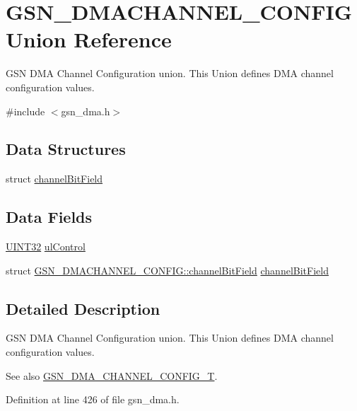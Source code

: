 \hypertarget{a00052}{
\section{GSN\_\-DMACHANNEL\_\-CONFIG Union Reference}
\label{a00052}
}


GSN DMA Channel Configuration union. This Union defines DMA channel configuration values.  




{\ttfamily \#include $<$gsn\_\-dma.h$>$}

\subsection*{Data Structures}
\begin{DoxyCompactItemize}
\item 
struct \hyperlink{a00010}{channelBitField}
\end{DoxyCompactItemize}
\subsection*{Data Fields}
\begin{DoxyCompactItemize}
\item 
\hyperlink{a00660_gae1e6edbbc26d6fbc71a90190d0266018}{UINT32} \hyperlink{a00052_a5010fc8f1769629024680e6365279fab}{ulControl}
\item 
struct \hyperlink{a00010}{GSN\_\-DMACHANNEL\_\-CONFIG::channelBitField} \hyperlink{a00052_ab53bac112bdc58b12855e9d3d7f4550e}{channelBitField}
\end{DoxyCompactItemize}


\subsection{Detailed Description}
GSN DMA Channel Configuration union. This Union defines DMA channel configuration values. 

\begin{DoxySeeAlso}{See also}
\hyperlink{a00645_ga39663b303d8a6ba93086369a284e1334}{GSN\_\-DMA\_\-CHANNEL\_\-CONFIG\_\-T}. 
\end{DoxySeeAlso}


Definition at line 426 of file gsn\_\-dma.h.



